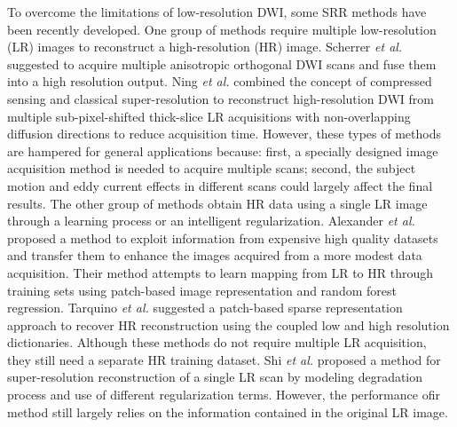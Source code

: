 To overcome the limitations of low-resolution DWI, some SRR methods have been recently developed.
One group of methods require multiple low-resolution (LR) images to reconstruct a high-resolution (HR) image.
%
Scherrer \emph{et al.} \cite{scherrer2012} suggested to acquire multiple anisotropic orthogonal DWI scans and fuse them into a high resolution output.
%
Ning \emph{et al.} \cite{ning2015} combined the concept of compressed sensing and classical super-resolution to reconstruct high-resolution DWI from multiple sub-pixel-shifted thick-slice LR acquisitions with non-overlapping diffusion directions to reduce acquisition time.
%
However, these types of methods are hampered for general applications because: first, a specially designed image acquisition method is needed to acquire multiple scans; second, the subject motion and eddy current effects in different scans could largely affect the final results.
%
The other group of methods obtain HR data using a single LR image through a learning process or an intelligent regularization.
%
Alexander \emph{et al.} \cite{alexander2014} proposed a method to exploit information from expensive high quality datasets and transfer them to enhance the images acquired from a more modest data acquisition. Their method attempts to learn mapping from LR to HR through training sets using patch-based image representation and random forest regression. Tarquino \emph{et al.} \cite{tarquino2014} suggested a patch-based sparse representation approach to recover HR reconstruction using the coupled low and high resolution dictionaries. Although these methods do not require multiple LR acquisition, they still need a separate HR training dataset.
Shi \emph{et al.} \cite{shi2015} proposed a method for super-resolution reconstruction of a single LR scan by modeling degradation process and use of different regularization terms. However, the performance ofir method still largely relies on the information contained in the original LR image.

